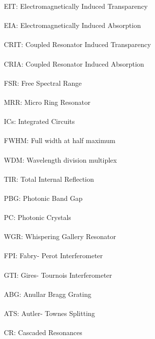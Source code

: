 
EIT: Electromagnetically Induced Transparency\\
\\EIA: Electromagnetically Induced Absorption\\
\\CRIT: Coupled Resonator Induced Transparency\\
\\CRIA: Coupled Resonator Induced Absorption\\
\\FSR: Free Spectral Range\\
\\MRR: Micro Ring Resonator\\
\\ICs: Integrated Circuits\\
\\FWHM: Full width at half maximum\\
\\WDM: Wavelength division multiplex\\
\\TIR: Total Internal Reflection\\
\\PBG: Photonic Band Gap\\
\\PC: Photonic Crystals\\
\\WGR: Whispering Gallery Resonator\\
\\FPI: Fabry- Perot Interferometer\\
\\GTI: Gires- Tournois Interferometer\\
\\ABG: Anullar Bragg Grating\\
\\ATS: Autler- Townes Splitting\\
\\CR: Cascaded Resonances\\